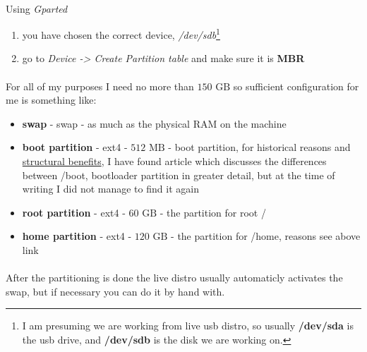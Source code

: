 \documentclass[11pt,a4paper]{article}
\begin{document}
                \paragraph{} Using \textit{Gparted}
                
                \begin{enumerate}
                    \item you have chosen the correct device, \textit{/dev/sdb}\footnote{ I am presuming we are working from live usb distro, so usually \textbf{/dev/sda} is the usb drive, and \textbf{/dev/sdb} is the disk we are working on.}
                    \item go to \textit{Device -> Create Partition table} and make sure it is \textbf{MBR}
                \end{enumerate}

                \paragraph{} For all of my purposes I need no more than $ 150 \mbox{ GB}$ so sufficient configuration for me is something like: 
                
                \begin{itemize}
                    \item \textbf{swap} - swap - as much as the physical RAM on the machine
                    \item \textbf{boot partition} - ext4 - $ 512 \mbox{ MB} $  - boot partition, for historical reasons and \href{https://superuser.com/questions/522971/is-a-boot-partition-always-necessary}{structural benefits}, I have found article which discusses the differences between /boot, bootloader partition in greater detail, but at the time of writing I did not manage to find it again
                    \item \textbf{root partition} - ext4 - $ 60 \mbox{ GB} $ - the partition for root /
                    \item \textbf{home partition} - ext4 - $ 120 \mbox{ GB} $ - the partition for /home, reasons see above link
                \end{itemize}

                \paragraph{} After the partitioning is done the live distro usually automaticly activates the swap, but if necessary you can do it by hand with.
\end{document}
